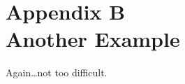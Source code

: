 \chapter[Another Example Appendix]{Appendix B\\Another Example}
\label{chap:AppB}
Again\ldots not too difficult.
